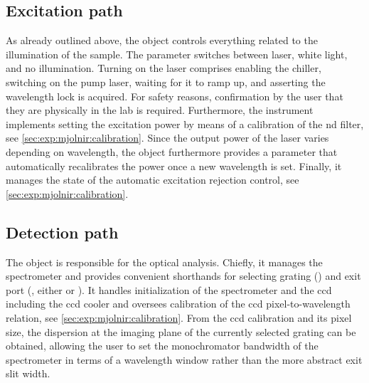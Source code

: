 \subsection{Excitation path}\label{subsec:exp:mjolnir:logical_instruments:exc}
\begin{marginfigure}
    
    \caption[]{
        Source tree structure of the \mjolnir package.
        Logical \qcodes instruments and parameters are defined in the  and  modules, respectively.
        Instruments are configured using  files located in a  subdirectory.
        The  module provides classes for the abstraction of measurements using \qcodes underneath.
        Live plots of instrument data as well as a plot function for multidimensional measurement data are defined in the  module.
         contains routines for power, \acrshort{ccd}, and excitation rejection calibrations.
        The  file is a code cell-based script that serves as the entrypoint for measurements.
    }
    \label{fig:exp:mjolnir:tree}
\end{marginfigure}
As already outlined above, the  object controls everything related to the illumination of the sample.
The  parameter switches between laser, white light, and no illumination.
Turning on the laser comprises enabling the chiller, switching on the pump laser, waiting for it to ramp up, and asserting the wavelength lock is acquired.
For safety reasons, confirmation by the user that they are physically in the lab is required.
Furthermore, the  instrument implements setting the excitation power by means of a calibration of the \gls{nd} filter, see \cref{sec:exp:mjolnir:calibration}.
Since the output power of the laser varies depending on wavelength, the object furthermore provides a  parameter that automatically recalibrates the power once a new wavelength is set.
Finally, it manages the state of the automatic excitation rejection control, see \cref{sec:exp:mjolnir:calibration}.

\subsection{Detection path}\label{subsec:exp:mjolnir:logical_instruments:det}
The  object is responsible for the optical analysis.
Chiefly, it manages the \thespectrometer spectrometer and provides convenient shorthands for selecting grating () and exit port (, either  or ).
It handles initialization of the spectrometer and the \gls{ccd} including the \gls{ccd} cooler and oversees calibration of the \gls{ccd} pixel-to-wavelength relation, see \cref{sec:exp:mjolnir:calibration}.
From the \gls{ccd} calibration and its pixel size, the dispersion at the imaging plane of the currently selected grating can be obtained, allowing the user to set the monochromator bandwidth of the spectrometer in terms of a wavelength window rather than the more abstract exit slit width.

